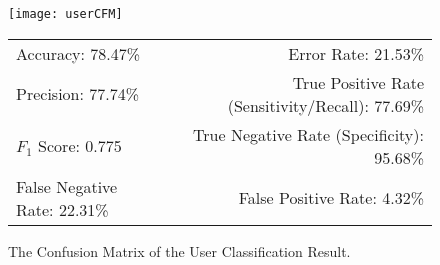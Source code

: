 \begin{figure}[!h]
	\centering
	\begin{minipage}{.45\linewidth}
		\texttt{[image: userCFM]}
		\vspace{.05in}
	\end{minipage}
	
	\centering
	\begin{tabular}{lr}
		\toprule
		Accuracy: 78.47\% & \hspace{-.55in} Error Rate: 21.53\% \\
		Precision: 77.74\% & \hspace{-.55in} True Positive Rate (Sensitivity/Recall): 77.69\% \\
		$F_1$ Score: 0.775 & \hspace{-.55in} True Negative Rate (Specificity): 95.68\% \\
		False Negative Rate: 22.31\%  & \hspace{-.55in} False Positive Rate: 4.32\% \\
		\bottomrule
	\end{tabular}
	\caption{The Confusion Matrix of the User Classification Result.
	}
	\label{fig:userCFM}
\end{figure}


